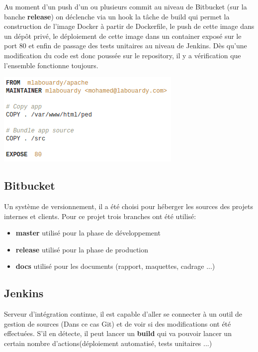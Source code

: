 \documentclass [a4paper,11pt]{article}
\begin{document}
Au moment d’un push d’un ou plusieurs commit au niveau de Bitbucket (sur la banche \textbf{release}) on déclenche via un hook la tâche de build qui permet la construction de l'image Docker à partir de Dockerfile, le push de cette image dans un dépôt privé, le déploiement de cette image dans un container exposé sur le port 80 et enfin de passage des tests unitaires au niveau de Jenkins. Dès qu’une modification du code est donc poussée sur le repository, il y a vérification que l’ensemble fonctionne toujours.

\begin{center}
\includegraphics[scale=0.7]{img/Dockerfile.png}
\end{center}

\subsection{Bitbucket}

Un système de versionnement, il a été choisi pour héberger les sources des projets internes et clients.\cite{BITBUCKET} Pour ce projet trois branches ont été utilisé:\newline

\begin{itemize}
 \item \textbf{master} utilisé pour la phase de développement
 \item \textbf{release} utilisé pour la phase de production
 \item \textbf{docs} utilisé pour les documents (rapport, maquettes, cadrage ...)
\end{itemize}

\subsection{Jenkins}

Serveur d'intégration continue, il est capable d’aller se connecter à un outil de gestion de sources (Dans ce cas Git) et de voir si des modifications ont été effectuées. S’il en détecte, il peut lancer un \textbf{build} qui va pouvoir lancer un certain nombre d’actions(déploiement automatisé, tests unitaires ...)
\end{document}
